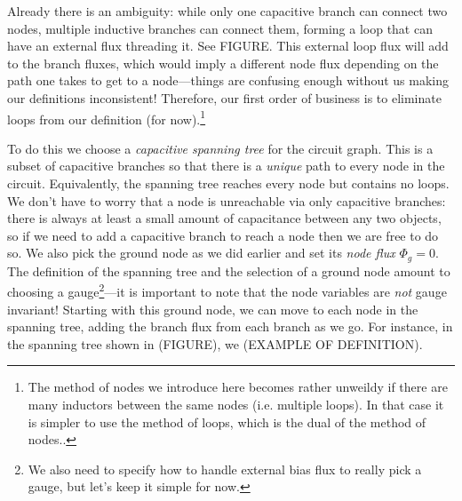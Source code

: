 Already there is an ambiguity: while only one capacitive branch can connect two nodes, multiple inductive branches can connect them, forming a loop that can have an external flux threading it. See FIGURE. This external loop flux will add to the branch fluxes, which would imply a different node flux depending on the path one takes to get to a node---things are confusing enough without us making our definitions inconsistent! Therefore, our first order of business is to eliminate loops from our definition (for now).\footnote{The method of nodes we introduce here becomes rather unweildy if there are many inductors between the same nodes  (i.e. multiple loops). In that case it is simpler to use the method of loops, which is the dual of the method of nodes..}

To do this we choose a \textit{capacitive spanning tree} for the circuit graph. This is a subset of capacitive branches so that there is a \textit{unique} path to every node in the circuit. Equivalently, the spanning tree reaches every node but contains no loops. We don't have to worry that a node is unreachable via only capacitive branches: there is always at least a small amount of capacitance between any two objects, so if we need to add a capacitive branch to reach a node then we are free to do so. We also pick the ground node as we did earlier and set its \textit{node flux} $\Phi_g = 0$. The definition of the spanning tree and the selection of a ground node amount to choosing a gauge\footnote{We also need to specify how to handle external bias flux to really pick a gauge, but let's keep it simple for now.}---it is important to note that the node variables are \textit{not} gauge invariant! Starting with this ground node, we can move to each node in the spanning tree, adding the branch flux from each branch as we go. For instance, in the spanning tree shown in (FIGURE), we (EXAMPLE OF DEFINITION).



